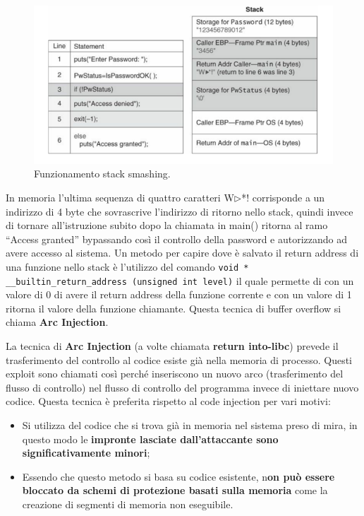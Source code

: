 \begin{figure}[H]
    \centering
    \includegraphics[width=13cm, keepaspectratio]{capitoli/secure_coding/img/cap_2/es_pass_ok_new.png}
    \caption{Funzionamento stack smashing.}\label{fig:es_pass_ok_new}
\end{figure}
In memoria l'ultima sequenza di quattro caratteri W$\triangleright$*! corrisponde a un indirizzo di 4 byte che sovrascrive l'indirizzo di ritorno nello stack, quindi invece di tornare all'istruzione subito dopo la chiamata in main() ritorna al ramo “Access granted” bypassando così il controllo della password e autorizzando ad avere accesso al sistema.
Un metodo per capire dove è salvato il return address di una funzione nello stack è l'utilizzo del comando
\verb|void * __builtin_return_address (unsigned int level)| il quale permette di con un valore di 0 di avere il return address della funzione corrente e con un valore di 1 ritorna il valore della funzione chiamante. Questa tecnica di buffer overflow si chiama \textbf{Arc Injection}.


La tecnica di \textbf{Arc Injection} (a volte chiamata \textbf{return into-libc}) prevede il trasferimento del controllo al codice esiste già nella memoria di processo.
Questi exploit sono chiamati così perché inseriscono un nuovo arco (trasferimento del flusso di controllo) nel flusso di controllo del programma invece di iniettare nuovo codice. Questa tecnica è preferita rispetto al code injection per vari motivi:
\begin{itemize}
    \item Si utilizza del codice che si trova già in memoria nel sistema preso di mira, in questo modo le \textbf{impronte lasciate dall'attaccante sono significativamente minori};
    \item Essendo che questo metodo si basa su codice esistente, n\textbf{on può essere bloccato da schemi di protezione basati sulla memoria} come la creazione di segmenti di memoria non eseguibile.
\end{itemize}

